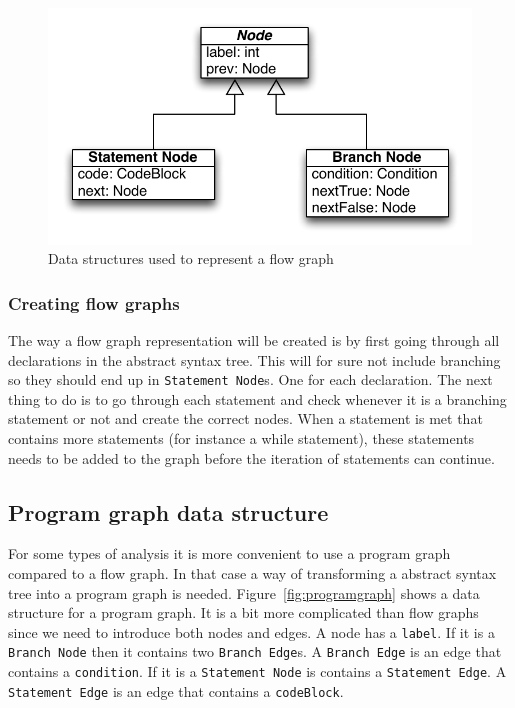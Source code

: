 \begin{figure}[h]
	\centering
	\includegraphics[scale=1.0]{../img/flow_graph}
	\caption{Data structures used to represent a flow graph}
	\label{fig:flowgraph}
\end{figure}

\subsubsection{Creating flow graphs}
The way a flow graph representation will be created is by first going through all declarations in the abstract syntax tree. This will for sure not include branching so they should end up in \texttt{Statement Node}s. One for each declaration. The next thing to do is to go through each statement and check whenever it is a branching statement or not and create the correct nodes. When a statement is met that contains more statements (for instance a while statement), these statements needs to be added to the graph before the iteration of statements can continue.


\subsection{Program graph data structure}
For some types of analysis it is more convenient to use a program graph compared to a flow graph. In that case a way of transforming a abstract syntax tree into a program graph is needed. Figure~\ref{fig:programgraph} shows a data structure for a program graph. It is a bit more complicated than flow graphs since we need to introduce both nodes and edges. A node has a \texttt{label}. If it is a \texttt{Branch Node} then it contains two \texttt{Branch Edge}s. A \texttt{Branch Edge} is an edge that contains a \texttt{condition}. If it is a \texttt{Statement Node} is contains a \texttt{Statement Edge}. A \texttt{Statement Edge} is an edge that contains a \texttt{codeBlock}.

